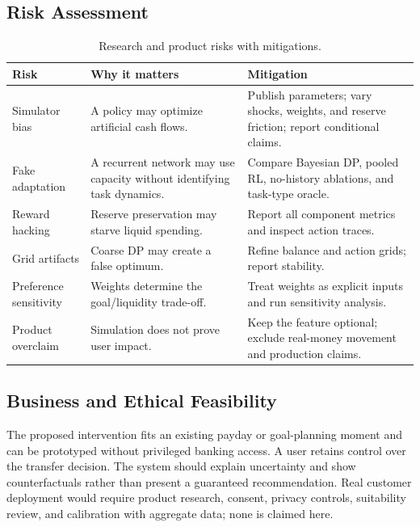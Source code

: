 \subsection{Risk Assessment}
\begin{table}[htbp]
\caption{Research and product risks with mitigations.}
\centering\scriptsize
\begin{tabular}{p{1.55cm}p{2.1cm}p{3.15cm}}
\toprule
\textbf{Risk} & \textbf{Why it matters} & \textbf{Mitigation}\\
\midrule
Simulator bias & A policy may optimize artificial cash flows. & Publish parameters; vary shocks, weights, and reserve friction; report conditional claims.\\
Fake adaptation & A recurrent network may use capacity without identifying task dynamics. & Compare Bayesian DP, pooled RL, no-history ablations, and task-type oracle.\\
Reward hacking & Reserve preservation may starve liquid spending. & Report all component metrics and inspect action traces.\\
Grid artifacts & Coarse DP may create a false optimum. & Refine balance and action grids; report stability.\\
Preference sensitivity & Weights determine the goal/liquidity trade-off. & Treat weights as explicit inputs and run sensitivity analysis.\\
Product overclaim & Simulation does not prove user impact. & Keep the feature optional; exclude real-money movement and production claims.\\
\bottomrule
\end{tabular}
\label{tab:risks}
\end{table}

\subsection{Business and Ethical Feasibility}
The proposed intervention fits an existing payday or goal-planning moment and can be prototyped without privileged banking access. A user retains control over the transfer decision. The system should explain uncertainty and show counterfactuals rather than present a guaranteed recommendation. Real customer deployment would require product research, consent, privacy controls, suitability review, and calibration with aggregate data; none is claimed here.
